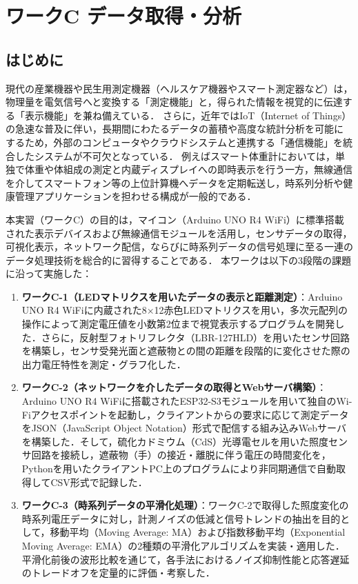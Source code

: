 \chapter{ワークC データ取得・分析}

\section{はじめに}
現代の産業機器や民生用測定機器（ヘルスケア機器やスマート測定器など）は，物理量を電気信号へと変換する「測定機能」と，得られた情報を視覚的に伝達する「表示機能」を兼ね備えている．
さらに，近年ではIoT（Internet of Things）の急速な普及に伴い，長期間にわたるデータの蓄積や高度な統計分析を可能にするため，外部のコンピュータやクラウドシステムと連携する「通信機能」を統合したシステムが不可欠となっている．
例えばスマート体重計においては，単独で体重や体組成の測定と内蔵ディスプレイへの即時表示を行う一方，無線通信を介してスマートフォン等の上位計算機へデータを定期転送し，時系列分析や健康管理アプリケーションを担わせる構成が一般的である．

本実習（ワークC）の目的は，マイコン（Arduino UNO R4 WiFi）に標準搭載された表示デバイスおよび無線通信モジュールを活用し，センサデータの取得，可視化表示，ネットワーク配信，ならびに時系列データの信号処理に至る一連のデータ処理技術を総合的に習得することである．
本ワークは以下の3段階の課題に沿って実施した：
\begin{enumerate}
    \item \textbf{ワークC-1（LEDマトリクスを用いたデータの表示と距離測定）}：Arduino UNO R4 WiFiに内蔵された8×12赤色LEDマトリクスを用い，多次元配列の操作によって測定電圧値を小数第2位まで視覚表示するプログラムを開発した．さらに，反射型フォトリフレクタ（LBR-127HLD）を用いたセンサ回路を構築し，センサ受発光面と遮蔽物との間の距離を段階的に変化させた際の出力電圧特性を測定・グラフ化した．
    \item \textbf{ワークC-2（ネットワークを介したデータの取得とWebサーバ構築）}：Arduino UNO R4 WiFiに搭載されたESP32-S3モジュールを用いて独自のWi-Fiアクセスポイントを起動し，クライアントからの要求に応じて測定データをJSON（JavaScript Object Notation）形式で配信する組み込みWebサーバを構築した．そして，硫化カドミウム（CdS）光導電セルを用いた照度センサ回路を接続し，遮蔽物（手）の接近・離脱に伴う電圧の時間変化を，Pythonを用いたクライアントPC上のプログラムにより非同期通信で自動取得してCSV形式で記録した．
    \item \textbf{ワークC-3（時系列データの平滑化処理）}：ワークC-2で取得した照度変化の時系列電圧データに対し，計測ノイズの低減と信号トレンドの抽出を目的として，移動平均（Moving Average: MA）および指数移動平均（Exponential Moving Average: EMA）の2種類の平滑化アルゴリズムを実装・適用した．平滑化前後の波形比較を通じて，各手法におけるノイズ抑制性能と応答遅延のトレードオフを定量的に評価・考察した．
\end{enumerate}


